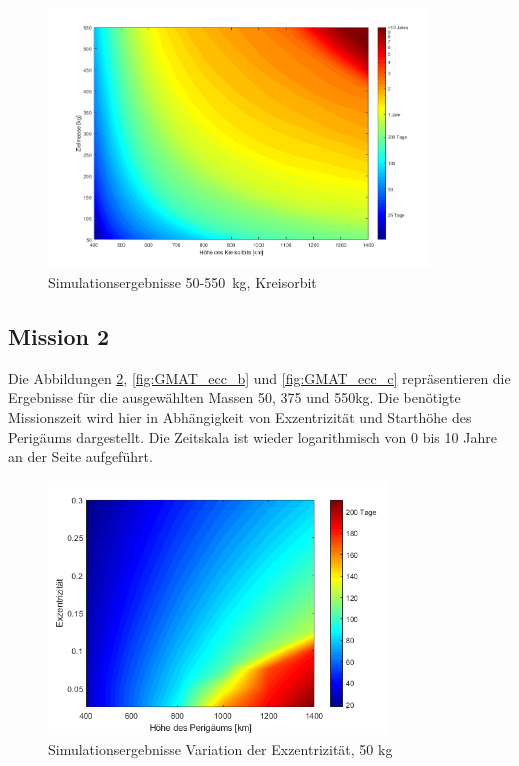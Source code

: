 \begin{figure}[H]
	\centering
		\includegraphics[width=0.90\textwidth]{./graphics/GMAT/GMAT_Mass_over_Height_550.png}
		\caption{Simulationsergebnisse \num{50}-\SI{550}{\kg}, Kreisorbit}
	\label{fig:GMAT_Mass_over_Height_b}
\end{figure}


\subsection{Mission 2}
Die Abbildungen \ref{fig:GMAT_ecc_a}, \ref{fig:GMAT_ecc_b} und \ref{fig:GMAT_ecc_c} repräsentieren die Ergebnisse für die ausgewählten Massen \num{50}, \num{375} und \num{550}\si{\kilogram}. Die benötigte Missionszeit wird hier in Abhängigkeit von Exzentrizität und Starthöhe des Perigäums dargestellt. Die Zeitskala ist wieder logarithmisch von \num{0} bis \num{10} Jahre an der Seite aufgeführt.


\begin{figure}[H]
	\centering
		\includegraphics[width=0.80\textwidth]{./graphics/GMAT/ecc_perigee_50kg.png}
		\caption{Simulationsergebnisse Variation der Exzentrizität, 50 kg}
	\label{fig:GMAT_ecc_a}
\end{figure}

